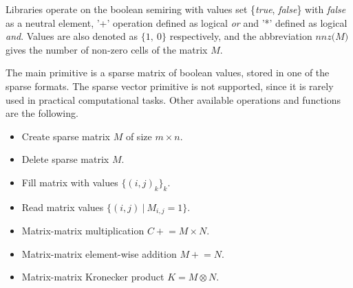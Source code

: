 Libraries operate on the boolean semiring with values set \{\textit{true}, \textit{false}\} with \textit{false} as
a neutral element, '+' operation defined as logical \textit{or} and '*' defined as logical \textit{and}.
Values are also denoted as $\{1,~0\}$ respectively, and the abbreviation $\textit{nnz(M)}$ gives the number of non-zero cells of the matrix $M$.

The main primitive is a sparse matrix of boolean values, stored in one of the sparse formats.
The sparse vector primitive is not supported, since it is rarely used in practical computational tasks.
Other available operations and functions are the following.


\begin{itemize}
    \item Create sparse matrix $M$ of size $m \times n$.
    \item Delete sparse matrix $M$.
    \item Fill matrix with values $\{(i,j)_k\}_k$.
    \item Read matrix values $\{(i, j)~|~M_{i,j} = 1\}$.
    \item Matrix-matrix multiplication $C \mathrel{+}= M \times N$.
    \item Matrix-matrix element-wise addition $M \mathrel{+}= N$.
    \item Matrix-matrix Kronecker product $K = M \otimes N$.
\end{itemize}